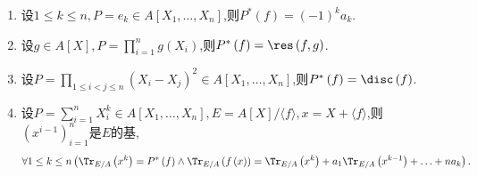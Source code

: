 \begin{example}{}{}
	\begin{enumerate}
		\item 设$1\leq k\leq n,P=e_{k}\in A[X_{1},\ldots,X_{n}]$,则$P^{\ast}\left(f\right)=\left(-1\right)^{k}a_{k}$.
		\item 设$g\in A[X],P=\prod\limits_{i=1}^{n}g\left(X_{i}\right)$,则$P^{\ast}\left(f\right)=\res\left(f,g\right)$.
		\item 设$P=\prod\limits_{1\leq i<j\leq n}\left(X_{i}-X_{j}\right)^{2}\in A[X_{1},\ldots,X_{n}]$,则$P^{\ast}\left(f\right)=\disc\left(f\right)$.
		\item 设$P=\sum\limits_{i=1}^{n}X_{i}^{k}\in A[X_{1},\ldots,X_{n}],E=A[X]/\langle f\rangle,x=X+\langle f\rangle$,则$\left(x^{i-1}\right)_{i=1}^{n}$是$E$的基,
		\begin{align*}
			\forall 1\leq k\leq n\left(\Tr_{E/A}\left(x^{k}\right)=P^{\ast}\left(f\right)\wedge\Tr_{E/A}\left(f\left(x\right)\right)=\Tr_{E/A}\left(x^{k}\right)+a_{1}\Tr_{E/A}\left(x^{k-1}\right)+\ldots+na_{k}\right).
		\end{align*}
	\end{enumerate}
\end{example}





























































